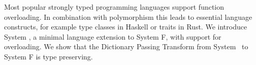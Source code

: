 Most popular strongly typed programming languages support function overloading. 
In combination with polymorphism this leads to essential language constructs, for example type classes in Haskell or traits in Rust.  
We introduce System \Fo, a minimal language extension to System F, with support for overloading.
We show that the Dictionary Passing Transform from System \Fo\ to System F is type preserving.